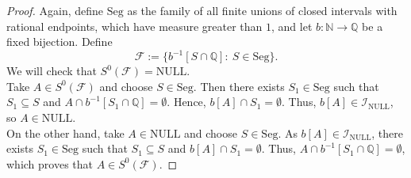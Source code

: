 \documentclass{amsart}
\theoremstyle{definition}
\theoremstyle{definition}
\newcommand{\N}{{\mathbb N}}
\newcommand{\Q}{{\mathbb Q}}
\newcommand{\calF}{\mathcal{F}}
\newcommand{\calI}{\mathcal{I}}
\newcommand{\MB}{S^0}  %
\newcommand{\Seg}{\mathrm{Seg}}
\newcommand{\NULL}{\mathrm{NULL}}
\newcommand{\INULL}{\calI_\mathrm{NULL}}
\newcommand{\cl}{\mathrm{cl}}
\newcommand{\interior}{\mathrm{int}}
\newcommand{\negligible}{\mathcal{N}}
\begin{document}
\begin{proof}
Again, define $\Seg$ as the family of all finite unions of closed intervals with rational endpoints, which have measure greater than $1$, and let $b\colon \N \to \Q$ be a fixed bijection.
Define 
$$\calF := \{b^{-1}[S\cap\Q] :\ S\in\Seg\}.$$
We will check that $\MB(\calF) = \NULL$.\\
Take $A\in \MB(\calF)$ and choose $S\in\Seg$. Then there exists $S_1\in\Seg$ such that $S_1\subseteq S$ and $A\cap b^{-1}[S_1\cap\Q] = \emptyset$. Hence, $b[A] \cap S_1 = \emptyset$. Thus, $b[A]\in\INULL$, so $A\in\NULL$.\\
On the other hand, take $A\in \NULL$ and choose $S\in\Seg$. As $b[A]\in\INULL$, there exists $S_1\in \Seg$ such that $S_1\subseteq S$ and $b[A]\cap S_1 = \emptyset$. Thus, $A \cap b^{-1}[S_1\cap\Q] = \emptyset$, which proves that $A\in \MB(\calF)$.
\end{proof}

\end{document}
